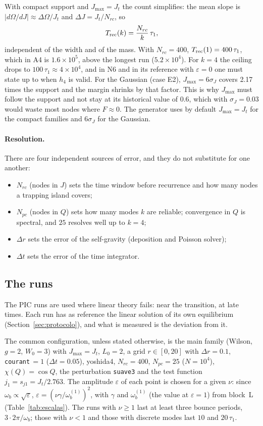 \documentclass[11pt,a4paper]{article}
\begin{document}
With compact support and $J_{\max}=J_t$ the count simplifies: the mean slope is
$|d\Omega/dJ|\approx\Delta\Omega/J_t$ and $\Delta J=J_t/N_{rc}$, so
\[
  T_{\rm rec}(k) = \frac{N_{rc}}{k}\,\tau_1 ,
\]
independent of the width and of the mass. With $N_{rc}=400$, $T_{\rm rec}(1)=400\,\tau_1$, which in
A4 is $1.6\times10^5$, above the longest run ($5.2\times10^4$). For $k=4$ the ceiling drops to
$100\,\tau_1\approx4\times10^4$, and in N6 and in its reference with $\varepsilon=0$ one must state up to
when $h_4$ is valid. For the Gaussian (case E2), $J_{\max}=6\sigma_J$ covers 2.17 times the
support and the margin shrinks by that factor. This is why $J_{\max}$ must follow the
support and not stay at its historical value of $0.6$, which with $\sigma_J=0.03$ would waste
most nodes where $F\approx0$. The generator uses by default $J_{\max}=J_t$ for the compact
families and $6\sigma_J$ for the Gaussian.

\paragraph{Resolution.}
\label{sec:resolucion}
There are four independent sources of error, and they do not substitute for one
another:
\begin{itemize}
\item $N_{rc}$ (nodes in $J$) sets the time window before recurrence and how many nodes a
trapping island covers;
\item $N_{pc}$ (nodes in $Q$) sets how many modes $k$ are reliable; convergence in $Q$ is
spectral, and $25$ resolves well up to $k=4$;
\item $\Delta r$ sets the error of the self-gravity (deposition and Poisson solver);
\item $\Delta t$ sets the error of the time integrator.
\end{itemize}

\subsection{The runs}
\label{sec:bateria}

The PIC runs are used where linear theory fails: near the transition, at late times.
Each run has as reference the linear solution of its own equilibrium
(Section~\ref{sec:protocolo}), and what is measured is the deviation from it.

The common configuration, unless stated otherwise, is the main family (Wilson, $g=2$,
$W_0=3$) with $J_{\max}=J_t$, $L_0=2$, a grid $r\in[0,20]$ with $\Delta r=0.1$,
\texttt{courant}\,$=1$ ($\Delta t=0.05$), yoshida4, $N_{rc}=400$, $N_{pc}=25$ ($N=10^4$),
$\chi(Q)=\cos Q$, the perturbation \texttt{suave3} and the test function $j_1=s_{j1}=J_t/2.763$.
The amplitude $\varepsilon$ of each point is chosen for a given $\nu$: since $\omega_b\propto\sqrt\varepsilon$,
$\varepsilon=(\nu\gamma/\omega_b^{(1)})^2$, with $\gamma$ and $\omega_b^{(1)}$ (the value at $\varepsilon=1$) from block~L
(Table~\ref{tab:escalas}). The runs with $\nu\ge1$ last at least three bounce periods,
$3\cdot2\pi/\omega_b$; those with $\nu<1$ and those with discrete modes last $10$ and $20\,\tau_1$.
\end{document}
